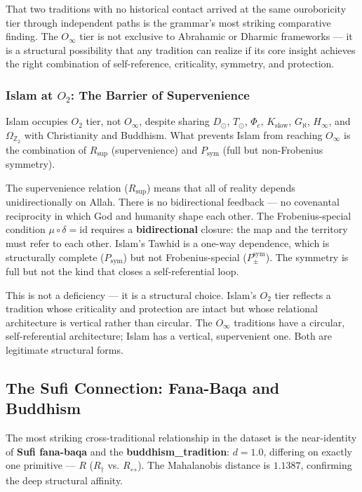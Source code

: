 \documentclass[12pt,a4paper]{article}
\begin{document}
That two traditions with no historical contact arrived at the same ouroboricity tier through independent paths is the grammar's most striking comparative finding. The $O_{\infty}$ tier is not exclusive to Abrahamic or Dharmic frameworks --- it is a structural possibility that any tradition can realize if its core insight achieves the right combination of self-reference, criticality, symmetry, and protection.

\subsubsection{Islam at $O_2$: The Barrier of Supervenience}

Islam occupies $O_2$ tier, not $O_{\infty}$, despite sharing $D_{\odot}$, $T_{\odot}$, $\Phi_c$, $K_\text{slow}$, $G_{\aleph}$, $H_{\infty}$, and $\Omega_{\mathbb{Z}_2}$ with Christianity and Buddhism. What prevents Islam from reaching $O_{\infty}$ is the combination of $R_\text{sup}$ (supervenience) and $P_\text{sym}$ (full but non-Frobenius symmetry).

The supervenience relation ($R_\text{sup}$) means that all of reality depends unidirectionally on Allah. There is no bidirectional feedback --- no covenantal reciprocity in which God and humanity shape each other. The Frobenius-special condition $\mu\circ\delta = \text{id}$ requires a \textbf{bidirectional} closure: the map and the territory must refer to each other. Islam's Tawhid is a one-way dependence, which is structurally complete ($P_\text{sym}$) but not Frobenius-special ($P_{\pm}^{\text{sym}}$). The symmetry is full but not the kind that closes a self-referential loop.

This is not a deficiency --- it is a structural choice. Islam's $O_2$ tier reflects a tradition whose criticality and protection are intact but whose relational architecture is vertical rather than circular. The $O_{\infty}$ traditions have a circular, self-referential architecture; Islam has a vertical, supervenient one. Both are legitimate structural forms.

\subsection{The Sufi Connection: Fana-Baqa and Buddhism}

The most striking cross-traditional relationship in the dataset is the near-identity of \textbf{Sufi fana-baqa} and the \textbf{buddhism\_tradition}: $d = 1.0$, differing on exactly one primitive --- $R$ ($R_{\dagger}$ vs. $R_{\leftrightarrow}$). The Mahalanobis distance is $1.1387$, confirming the deep structural affinity.
\end{document}
